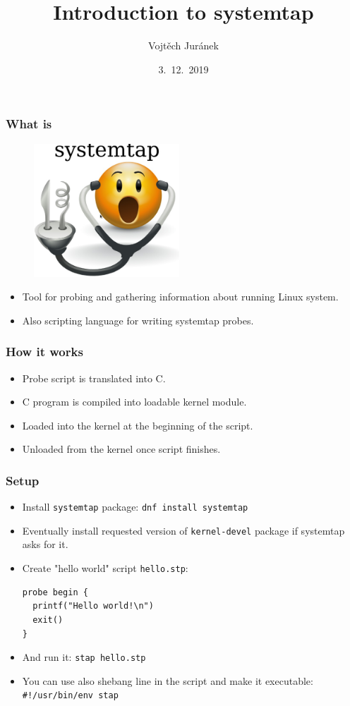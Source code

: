 \documentclass[10pt,utf8]{beamer}
\title{Introduction to systemtap}
\author{Vojtěch Juránek}
\institute[Red Hat]{oVirt storage team}
\date{3.~12.~2019}
\begin{document}
\begin{frame}
	\titlepage
\end{frame}

\begin{frame}
	\frametitle{What is }
	\begin{figure}
            \centering
            \includegraphics[height=5cm]{./img/stap.eps}
        \end{figure}
	
	\hspace{1cm}
	
	\begin{itemize}
		\item Tool for probing and gathering information about running Linux system.
		\item Also scripting language for writing systemtap probes.
	\end{itemize}

\end{frame}

\begin{frame}
	\frametitle{How it works}
	\begin{itemize}
		\item Probe script is translated into C.
		\item C program is compiled into loadable kernel module.
		\item Loaded into the kernel at the beginning of the script.
		\item Unloaded from the kernel once script finishes.
	\end{itemize}
\end{frame}

\begin{frame}[fragile]
    \frametitle{Setup}
    \begin{itemize}
        \item Install \texttt{systemtap} package: \texttt{dnf install systemtap}
        \item Eventually install requested version of \texttt{kernel-devel} package if systemtap asks for it.
        \item Create "hello world" script  \texttt{hello.stp}:
            \begin{lstlisting}[style=Bash]
probe begin {
  printf("Hello world!\n")
  exit()
}
            \end{lstlisting}
        \item And run it: \texttt{stap hello.stp}
        \item You can use also shebang line in the script and make it executable: \texttt{\#!/usr/bin/env stap}
    \end{itemize}
\end{frame}
\end{document}
